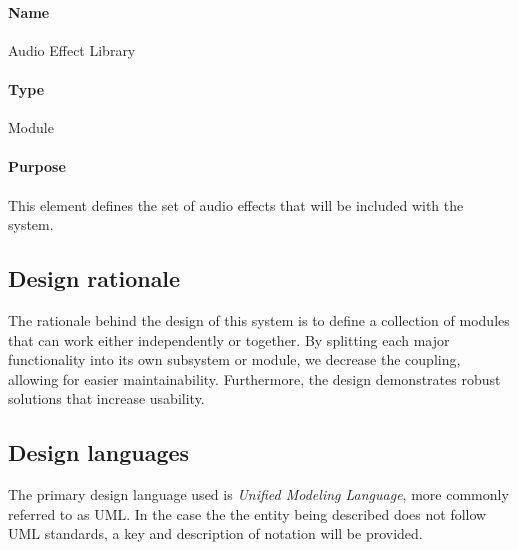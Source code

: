         \paragraph{Name}    Audio Effect Library
        \paragraph{Type}    Module
        \paragraph{Purpose} This element defines the set of audio effects that will be included with the system.
        
\subsection{Design rationale}
The rationale behind the design of this system is to define a collection of modules that can work either independently or together. By splitting each major functionality into its own subsystem or module, we decrease the coupling, allowing for easier maintainability. Furthermore, the design demonstrates robust solutions that increase usability.

\subsection{Design languages}
The primary design language used is \textit{Unified Modeling Language}, more commonly referred to as UML. In the case the the entity being described does not follow UML standards, a key and description of notation will be provided.
